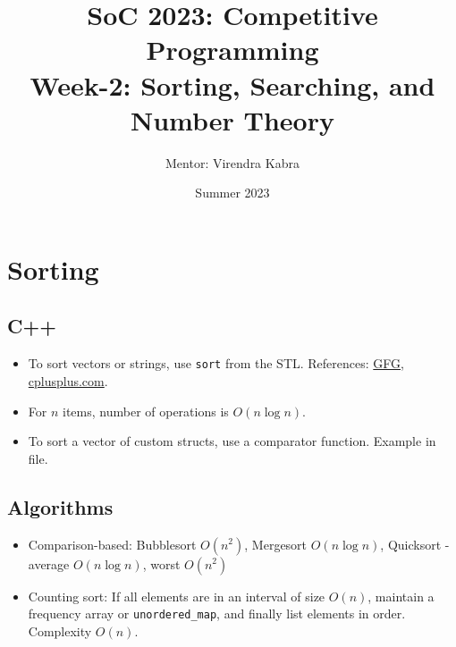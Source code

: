 \documentclass{article}
\title{\textbf{SoC 2023: Competitive Programming \\ {\Large Week-2: Sorting, Searching, and Number Theory}}}
\author{Mentor: Virendra Kabra}
\date{Summer 2023}
\newcommand{\T}[1]{\texttt{#1}}
\begin{document}
\begin{sloppypar}       %

    \maketitle
    \tableofcontents
    \thispagestyle{empty}

    \newpage

    \section{Sorting}

    \subsection{C++}
    \begin{itemize}
        \item To sort vectors or strings, use \T{sort} from the STL. References: \href{https://www.geeksforgeeks.org/sort-c-stl/}{GFG}, \href{https://cplusplus.com/reference/algorithm/sort/}{cplusplus.com}.
        \item For $n$ items, number of operations is $O(n \log n)$.
        \item To sort a vector of custom structs, use a comparator function. Example in file.
    \end{itemize}

    \subsection{Algorithms}
    \begin{itemize}
        \item Comparison-based: Bubblesort $O(n^2)$, Mergesort $O(n\log n)$, Quicksort - average $O(n\log n)$, worst $O(n^2)$
        \item Counting sort: If all elements are in an interval of size $O(n)$, maintain a frequency array or \T{unordered\_map}, and finally list elements in order. Complexity $O(n)$.
    \end{itemize}


\end{sloppypar}
\end{document}
